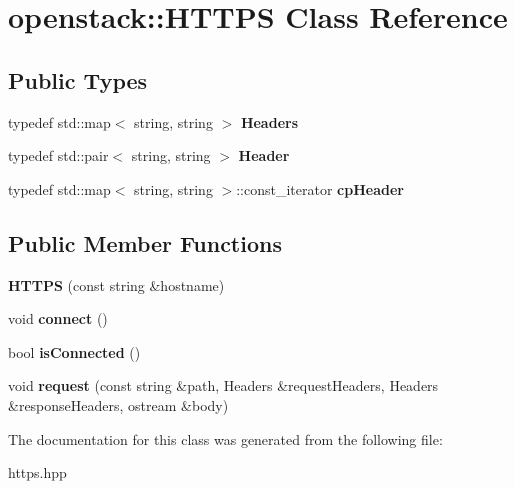 \hypertarget{classopenstack_1_1HTTPS}{
\section{openstack::HTTPS Class Reference}
\label{classopenstack_1_1HTTPS}
}
\subsection*{Public Types}
\begin{DoxyCompactItemize}
\item 
\hypertarget{classopenstack_1_1HTTPS_a1ce92d056b148653076819be95987911}{
typedef std::map$<$ string, string $>$ {\bfseries Headers}}
\label{classopenstack_1_1HTTPS_a1ce92d056b148653076819be95987911}

\item 
\hypertarget{classopenstack_1_1HTTPS_a929312989d5596b4a94dae5c80431369}{
typedef std::pair$<$ string, string $>$ {\bfseries Header}}
\label{classopenstack_1_1HTTPS_a929312989d5596b4a94dae5c80431369}

\item 
\hypertarget{classopenstack_1_1HTTPS_a9750f0881216916684d4453b35191cf8}{
typedef std::map$<$ string, string $>$::const\_\-iterator {\bfseries cpHeader}}
\label{classopenstack_1_1HTTPS_a9750f0881216916684d4453b35191cf8}

\end{DoxyCompactItemize}
\subsection*{Public Member Functions}
\begin{DoxyCompactItemize}
\item 
\hypertarget{classopenstack_1_1HTTPS_a093bf160dafeba7b41bedd11fb95e9d4}{
{\bfseries HTTPS} (const string \&hostname)}
\label{classopenstack_1_1HTTPS_a093bf160dafeba7b41bedd11fb95e9d4}

\item 
\hypertarget{classopenstack_1_1HTTPS_ad07132f8787c5cbbf97d899febd317c6}{
void {\bfseries connect} ()}
\label{classopenstack_1_1HTTPS_ad07132f8787c5cbbf97d899febd317c6}

\item 
\hypertarget{classopenstack_1_1HTTPS_a8e98dab2ae64a693d3bb8045e7ccba2e}{
bool {\bfseries isConnected} ()}
\label{classopenstack_1_1HTTPS_a8e98dab2ae64a693d3bb8045e7ccba2e}

\item 
\hypertarget{classopenstack_1_1HTTPS_a3afe66da2e4cb51ee80529cd9f8ade49}{
void {\bfseries request} (const string \&path, Headers \&requestHeaders, Headers \&responseHeaders, ostream \&body)}
\label{classopenstack_1_1HTTPS_a3afe66da2e4cb51ee80529cd9f8ade49}

\end{DoxyCompactItemize}


The documentation for this class was generated from the following file:\begin{DoxyCompactItemize}
\item 
https.hpp\end{DoxyCompactItemize}
